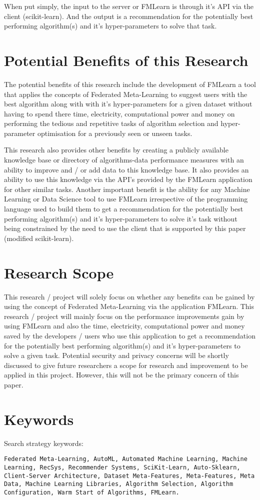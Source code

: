 When put simply, the input to the server or FMLearn is through it's API via the client (scikit-learn). And the output is a recommendation for the potentially best performing algorithm(s) and it's hyper-parameters to solve that task.

\section{Potential Benefits of this Research}
The potential benefits of this research include the development of FMLearn a tool that applies the concepts of Federated Meta-Learning to suggest users with the best algorithm along with with it's hyper-parameters for a given dataset without having to spend there time, electricity, computational power and money on performing the tedious and repetitive tasks of algorithm selection and hyper-parameter optimisation for a previously seen or unseen tasks.

This research also provides other benefits by creating a publicly available knowledge base or directory of algorithms-data performance measures with an ability to improve and / or add data to this knowledge base. It also provides an ability to use this knowledge via the API's provided by the FMLearn application for other similar tasks. Another important benefit is the ability for any Machine Learning or Data Science tool to use FMLearn irrespective of the programming language used to build them to get a recommendation for the potentially best performing algorithm(s) and it's hyper-parameters to solve it's task without being constrained by the need to use the client that is supported by this paper (modified scikit-learn).

\section{Research Scope}
This research / project will solely focus on whether any benefits can be gained by using the concept of Federated Meta-Learning via the application FMLearn. This research / project will mainly focus on the performance improvements gain by using FMLearn and also the time, electricity, computational power and money saved by the developers / users who use this application to get a recommendation for the potentially best performing algorithm(s) and it's hyper-parameters to solve a given task. Potential security and privacy concerns will be shortly discussed to give future researchers a scope for research and improvement to be applied in this project. However, this will not be the primary concern of this paper.

\section{Keywords}
Search strategy keywords:

\texttt{Federated Meta-Learning, AutoML, Automated Machine Learning, Machine Learning, RecSys, Recommender Systems, SciKit-Learn, Auto-Sklearn, Client-Server Architecture, Dataset Meta-Features, Meta-Features, Meta Data, Machine Learning Libraries, Algorithm Selection, Algorithm Configuration, Warm Start of Algorithms, FMLearn.}
